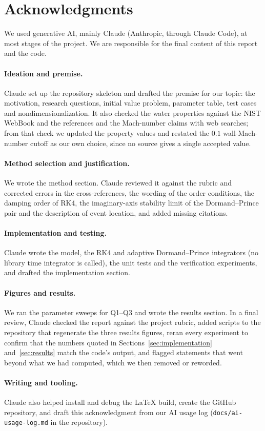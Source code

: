 \section*{Acknowledgments}\label{sec:acknowledgments}

We used generative AI, mainly Claude (Anthropic, through Claude Code), at most stages of the
project. We are responsible for the final content of this report and the code.

\paragraph{Ideation and premise.} Claude set up the repository skeleton and drafted the
premise for our topic: the motivation, research questions, initial value problem, parameter
table, test cases and nondimensionalization. It also checked the water properties against
the NIST WebBook and the references and the Mach-number claims with web searches; from that
check we updated the property values and restated the $0.1$ wall-Mach-number cutoff as our
own choice, since no source gives a single accepted value.

\paragraph{Method selection and justification.} We wrote the method section. Claude
reviewed it against the rubric and corrected errors in the cross-references, the wording of
the order conditions, the damping order of RK4, the imaginary-axis stability limit of the
Dormand--Prince pair and the description of event location, and added missing citations.

\paragraph{Implementation and testing.} Claude wrote the model, the RK4 and adaptive
Dormand--Prince integrators (no library time integrator is called), the unit tests and the
verification experiments, and drafted the implementation section.

\paragraph{Figures and results.} We ran the parameter sweeps for Q1--Q3 and wrote the
results section. In a final review, Claude checked the report against the project rubric,
added scripts to the repository that regenerate the three results figures, reran every
experiment to confirm that the numbers quoted in Sections~\ref{sec:implementation}
and~\ref{sec:results} match the code's output, and flagged statements that went beyond
what we had computed, which we then removed or reworded.

\paragraph{Writing and tooling.} Claude also helped install and debug the \LaTeX{} build,
create the GitHub repository, and draft this acknowledgment from our AI usage log
(\texttt{docs/ai-usage-log.md} in the repository).
